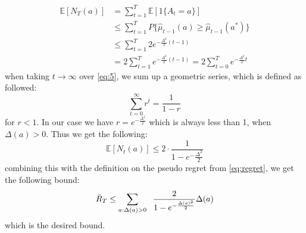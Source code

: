 \documentclass{article}
\begin{document}
\begin{align}
\mathbb{E}[N_T(a)] &= \sum\limits_{t=1}^T \mathbb{E}[1\lbrace A_t=a \rbrace ] \\ &\leq \sum\limits_{t=1}^T P \lbrace \hat{\mu}_{t-1}(a) \geq \hat{\mu}_{t-1}(a^*) \rbrace \\
&\leq \sum\limits_{t=1}^T 2e^{-\frac{\Delta^2}{2}(t-1)} \\
&= 2 \sum\limits_{t=1}^T e^{-\frac{\Delta^2}{2}(t-1)} = 2 \sum\limits_{t=0}^T e^{-\frac{\Delta^2}{2}t}
\label{eq:5}
\end{align}
when taking $t \rightarrow \infty$ over \eqref{eq:5}, we sum up a geometric series, which is defined as followed:
\begin{equation}
\sum\limits_{t=0}^\infty r^t = \dfrac{1}{1-r} 
\end{equation}
for $r<1$. In our case we have $r = e^{-\frac{\Delta^2}{2}}$ which is always less than 1, when $\Delta(a) > 0$. Thus we get the following:
\begin{equation}
\mathbb{E}[N_t(a)] \leq 2 \cdot \frac{1}{1-e^- \frac{\Delta^2}{2}}
\end{equation}
combining this with the definition on the pseudo regret from \eqref{eq:regret}, we get the following bound:
\begin{equation}
\bar{R}_T \leq \sum\limits_{a:\Delta(a) > 0} \hspace{0.2cm} \dfrac{2}{ 1 - e^{- \frac{\Delta(a)^2}{2}}} \Delta(a)
\end{equation}
which is the desired bound.
\end{document}
